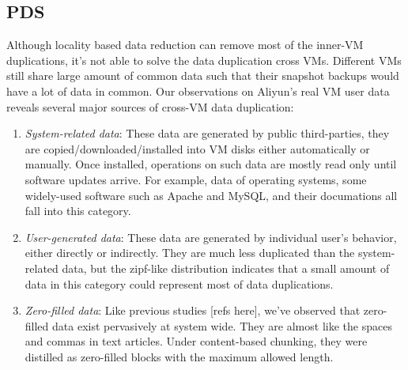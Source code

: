

\subsection{PDS}
Although locality based data reduction can remove most of the inner-VM duplications,
it's not able to solve the data duplication cross VMs. Different VMs still share large amount
of common data such that their snapshot backups would have a lot of data in common.
Our observations on Aliyun's real VM user data reveals several major sources of cross-VM data duplication:
  \begin{enumerate}
  \item \emph{System-related data}: These data are generated by public third-parties, they are copied/downloaded/installed into VM disks either automatically or manually. Once installed, operations on such data are mostly read only until software updates arrive. For example, data of operating systems, some widely-used software such as Apache and MySQL, and their documations all fall into this category.
  \item \emph{User-generated data}: These data are generated by individual user's behavior, either directly or indirectly. They are much less duplicated than the system-related data, but the zipf-like distribution indicates that a small amount of data in this category could represent most of data duplications.
  \item \emph{Zero-filled data}: Like previous studies [refs here], we've observed that zero-filled data exist pervasively at system wide. They are almost like the spaces and commas in text articles. Under content-based chunking, they were distilled as zero-filled blocks with the maximum allowed length. 
  \end{enumerate}

